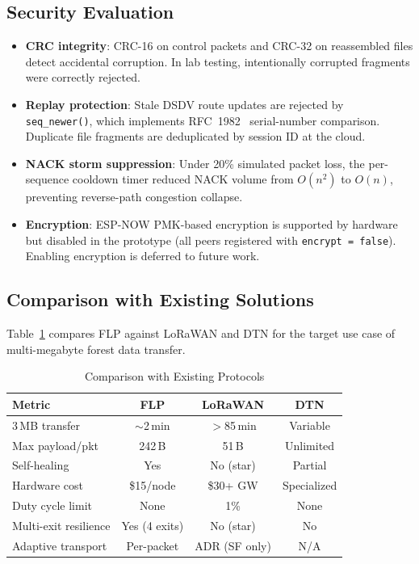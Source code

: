 \documentclass[conference]{IEEEtran}
\begin{document}
\subsection{Security Evaluation}

\begin{itemize}
  \item \textbf{CRC integrity}: CRC-16 on control packets and CRC-32 on reassembled files detect accidental corruption. In lab testing, intentionally corrupted fragments were correctly rejected.
  \item \textbf{Replay protection}: Stale DSDV route updates are rejected by \texttt{seq\_newer()}, which implements RFC~1982~\cite{rfc1982} serial-number comparison. Duplicate file fragments are deduplicated by session ID at the cloud.
  \item \textbf{NACK storm suppression}: Under 20\% simulated packet loss, the per-sequence cooldown timer reduced NACK volume from $O(n^2)$ to $O(n)$, preventing reverse-path congestion collapse.
  \item \textbf{Encryption}: ESP-NOW PMK-based encryption is supported by hardware but disabled in the prototype (all peers registered with \texttt{encrypt = false}). Enabling encryption is deferred to future work.
\end{itemize}

\subsection{Comparison with Existing Solutions}

Table~\ref{tab:comparison} compares FLP against LoRaWAN and DTN for the target use case of multi-megabyte forest data transfer.

\begin{table}[htbp]
  \centering
  \caption{Comparison with Existing Protocols}
  \label{tab:comparison}
  \begin{tabular}{@{}lccc@{}}
    \toprule
    \textbf{Metric} & \textbf{FLP} & \textbf{LoRaWAN} & \textbf{DTN} \\
    \midrule
    3\,MB transfer & $\sim$2\,min & $>$85\,min & Variable \\
    Max payload/pkt & 242\,B & 51\,B & Unlimited \\
    Self-healing & Yes & No (star) & Partial \\
    Hardware cost & \$15/node & \$30+ GW & Specialized \\
    Duty cycle limit & None & 1\% & None \\
    Multi-exit resilience & Yes (4 exits) & No (star) & No \\
    Adaptive transport & Per-packet & ADR (SF only) & N/A \\
    \bottomrule
  \end{tabular}
\end{table}
\end{document}
